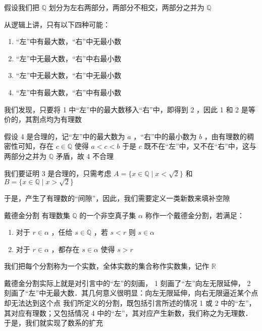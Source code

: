 
\begin{issues}
\issueTODO
\end{issues}
假设我们把 $\mathbb{Q}$ 划分为左右两部分，两部分不相交，两部分之并为 $\mathbb{Q}$

从逻辑上讲，只有以下四种可能：

\begin{enumerate}
\item “左”中有最大数，“右”中无最小数
\item “左”中无最大数，“右”中右最小数
\item “左”中无最大数，“右”中无最小数
\item “左”中有最大数，“右”中有最小数
\end{enumerate}
我们发现，只要将 1 中“左”中的最大数移入“右”中，即得到 2 ，因此 1 和 2 是等价的，其割点均为有理数

假设 4 是合理的，记“左”中的最大数为 $a$ ，“右”中的最小数为 $b$ ，由有理数的稠密性可知，存在 $c\in\mathbb{Q}$ 使得 $\displaystyle{a<c<b}$ 于是 $c$ 既不在“左”中，又不在“右”中，这与两部分之并为 $\mathbb{Q}$ 矛盾，故 4 不合理

我们要证明 3 是合理的，只需考虑 $A=\{x\in\mathbb{Q}\mid x<\sqrt{2}\}$ 和 $B=\{x\in\mathbb{Q}\mid x>\sqrt{2}\}$

于是，产生了有理数的“间隙”，因此，我们需要定义一类新数来填补空隙

\begin{definition}{戴德金分割}
有理数集 $\mathbb{Q}$ 的一个非空真子集 $\alpha$  称作一个戴德金分割，若满足：
\begin{enumerate}
\item 对于 $r\in \alpha$ ，任给 $s\in\mathbb{Q}$ ，若 $s<r$ 则 $s\in\alpha$ 
\item 对于 $r\in \alpha$ ，都存在 $s\in\alpha$ 使得 $s>r$ 
\end{enumerate}
我们把每个分割称为一个实数，全体实数的集合称作实数集，记作 $\mathbb{R}$ 
\end{definition}
戴德金分割实际上就是对引言中的“左”的刻画， 1 刻画了“左”向左无限延伸， 2 刻画了“左”中无最大数．其几何意义很明显：向左无限延伸，向右无限逼近某个点却无法达到这个点
我们所定义的分割，既包括引言所述的情况 1 或 2 中的“左”，其对应有理数；又包括情况 4 中的“左”，其对应产生新数，我们称之为无理数．于是，我们就实现了数系的扩充

